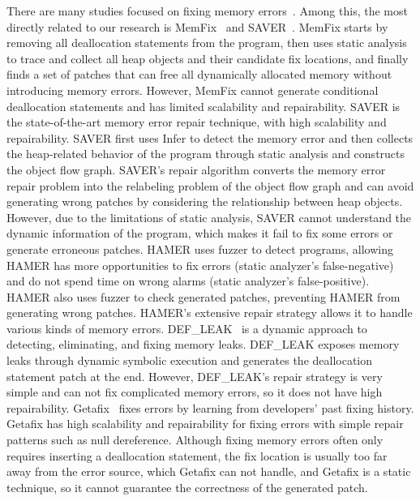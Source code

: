 \documentclass[a4paper,11pt,oneside,openany]{book}
\begin{document}
There are many studies focused on fixing memory errors~\cite{melt,leakpoint,leakfix,survey,ownership,transfor,typebase,fractional,footpatch,leakchaser,defleak,SAVER}. Among this, the most directly related to our research is MemFix~\cite{Memfix} and SAVER~\cite{SAVER}. MemFix starts by removing all deallocation statements from the program, then uses static analysis to trace and collect all heap objects and their candidate fix locations, and finally finds a set of patches that can free all dynamically allocated memory without introducing memory errors. However, MemFix cannot generate conditional deallocation statements and has limited scalability and repairability. SAVER is the state-of-the-art memory error repair technique, with high scalability and repairability. SAVER first uses Infer to detect the memory error and then collects the heap-related behavior of the program through static analysis and constructs the object flow graph. SAVER's repair algorithm converts the memory error repair problem into the relabeling problem of the object flow graph and can avoid generating wrong patches by considering the relationship between heap objects. However, due to the limitations of static analysis, SAVER cannot understand the dynamic information of the program, which makes it fail to fix some errors or generate erroneous patches. HAMER uses fuzzer to detect programs, allowing HAMER has more opportunities to fix errors (static analyzer's false-negative) and do not spend time on wrong alarms (static analyzer's false-positive). HAMER also uses fuzzer to check generated patches, preventing HAMER from generating wrong patches. HAMER's extensive repair strategy allows it to handle various kinds of memory errors. DEF\_LEAK~\cite{defleak} is a dynamic approach to detecting, eliminating, and fixing memory leaks. DEF\_LEAK exposes memory leaks through dynamic symbolic execution and generates the deallocation statement patch at the end.  However, DEF\_LEAK's repair strategy is very simple and can not fix complicated memory errors, so it does not have high repairability. Getafix~\cite{Getafix} fixes errors by learning from developers' past fixing history. Getafix has high scalability and repairability for fixing errors with simple repair patterns such as null dereference. Although fixing memory errors often only requires inserting a deallocation statement, the fix location is usually too far away from the error source, which Getafix can not handle, and Getafix is a static technique, so it cannot guarantee the correctness of the generated patch.
\end{document}
